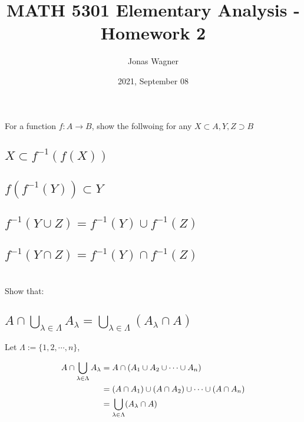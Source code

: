 \documentclass[]{article}
\title{MATH 5301 Elementary Analysis - Homework 2}
\author{Jonas Wagner}
\date{2021, September 08}
\begin{document}
\maketitle

\section{}
For a function $f : A \rightarrow B$, show the follwoing for any $X \subset A, Y, Z \supset B$

\subsection{$X \subset f^{-1}(f(X))$}


\subsection{$f(f^{-1}(Y)) \subset Y$}


\subsection{$f^{-1}(Y \cup Z) = f^{-1}(Y) \cup f^{-1}(Z)$}




\subsection{$f^{-1}(Y \cap Z) = f^{-1}(Y) \cap f^{-1}(Z)$}





\newpage
\section{}
Show that:

\subsection{
	$A \cap \bigcup\limits_{\lambda \in \Lambda}  A_\lambda 
	= \bigcup\limits_{\lambda \in \Lambda} (A_\lambda \cap A)$
}

Let $\Lambda := \{1, 2, \cdots, n\}$,

\begin{align*}
	A \cap \bigcup\limits_{\lambda \in \Lambda}  A_\lambda
	&= A \cap \qty(A_1 \cup A_2 \cup \cdots \cup A_n)\\
	&= (A \cap A_1) \cup (A \cap A_2) \cup \cdots \cup (A \cap A_n)\\
	&= \bigcup\limits_{\lambda \in \Lambda} (A_\lambda \cap A)
\end{align*}
\end{document}
